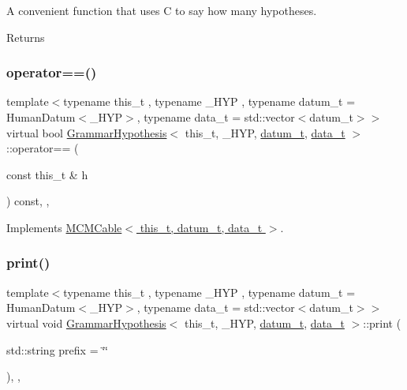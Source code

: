 A convenient function that uses C to say how many hypotheses. 

\begin{DoxyReturn}{Returns}

\end{DoxyReturn}
\mbox{\label{class_grammar_hypothesis_a5af8ece466cdc1d0fc2a960ae1d63462}} 
\subsubsection{\texorpdfstring{operator==()}{operator==()}}
{\footnotesize\ttfamily template$<$typename this\+\_\+t , typename \+\_\+\+H\+YP , typename datum\+\_\+t  = Human\+Datum$<$\+\_\+\+H\+Y\+P$>$, typename data\+\_\+t  = std\+::vector$<$datum\+\_\+t$>$$>$ \\
virtual bool \hyperlink{class_grammar_hypothesis}{Grammar\+Hypothesis}$<$ this\+\_\+t, \+\_\+\+H\+YP, \hyperlink{class_bayesable_a9f1a6c0cd7855550fa10b1a8f13a5867}{datum\+\_\+t}, \hyperlink{class_bayesable_aa2788c4d7718c0a824e1d28c4c98f921}{data\+\_\+t} $>$\+::operator== (\begin{DoxyParamCaption}\item[{const this\+\_\+t \&}]{h }\end{DoxyParamCaption}) const\hspace{0.3cm}{\ttfamily [inline]}, {\ttfamily [override]}, {\ttfamily [virtual]}}



Implements \hyperlink{class_m_c_m_cable_a7b35c04d3d1326b930cfc69dfe0bd207}{M\+C\+M\+Cable$<$ this\+\_\+t, datum\+\_\+t, data\+\_\+t $>$}.

\mbox{\label{class_grammar_hypothesis_a7b791d9da5ae86c52a42a2383c1c6bc0}} 
\subsubsection{\texorpdfstring{print()}{print()}}
{\footnotesize\ttfamily template$<$typename this\+\_\+t , typename \+\_\+\+H\+YP , typename datum\+\_\+t  = Human\+Datum$<$\+\_\+\+H\+Y\+P$>$, typename data\+\_\+t  = std\+::vector$<$datum\+\_\+t$>$$>$ \\
virtual void \hyperlink{class_grammar_hypothesis}{Grammar\+Hypothesis}$<$ this\+\_\+t, \+\_\+\+H\+YP, \hyperlink{class_bayesable_a9f1a6c0cd7855550fa10b1a8f13a5867}{datum\+\_\+t}, \hyperlink{class_bayesable_aa2788c4d7718c0a824e1d28c4c98f921}{data\+\_\+t} $>$\+::print (\begin{DoxyParamCaption}\item[{std\+::string}]{prefix = {\ttfamily \char`\"{}\char`\"{}} }\end{DoxyParamCaption})\hspace{0.3cm}{\ttfamily [inline]}, {\ttfamily [override]}, {\ttfamily [virtual]}}



